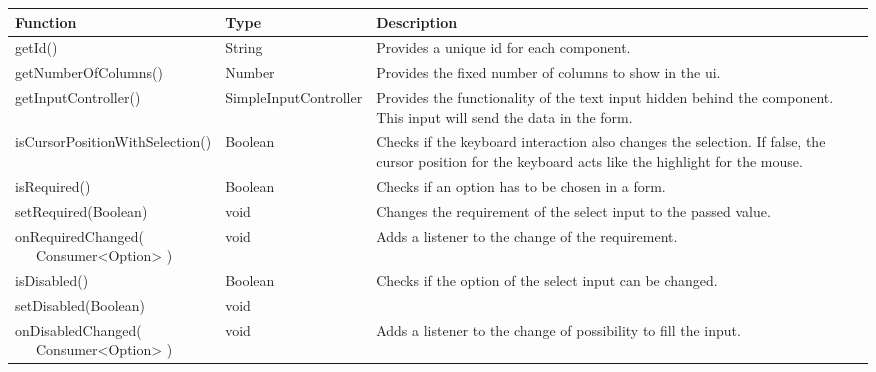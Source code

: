 \begin{table}[!htb] 
    \label{api:selectControllerReturn}
    \footnotesize
    \setlength\extrarowheight{4pt}
    \begin{tabular}{ p{5cm} p{3cm} p{4.5cm} }
        \toprule[1.2pt]
        \textbf{Function}                    & \textbf{Type}          & \textbf{Description} \\
        \midrule
        getId()                              & String                 & Provides a unique id for each component. \\
        getNumberOfColumns()                 & Number                 & Provides the fixed number of columns to show in the ui. \\
        getInputController()                 & SimpleInputController  & Provides the functionality of the text input hidden behind the component. 
                                                                        This input will send the data in the form. \\
        isCursorPositionWithSelection()      & Boolean                & Checks if the keyboard interaction also changes the selection. 
                                                                        If false, the cursor position for the keyboard acts like the highlight for the mouse. \\
        isRequired()                         & Boolean                & Checks if an option has to be chosen in a form. \\
        setRequired(Boolean)                 & void                   & Changes the requirement of the select input to the passed value. \\
        \tbbr{
            onRequiredChanged( \\
                \ \ \ Consumer<Option>
            )}                               & void                   & Adds a listener to the change of the requirement. \\
        isDisabled()                         & Boolean                & Checks if the option of the select input can be changed.  \\
        setDisabled(Boolean)                 & void                   &  \\
        \tbbr{
            onDisabledChanged( \\
                \ \ \ Consumer<Option>
            )}                               & void                   & Adds a listener to the change of possibility to fill the input. \\

\end{tabular}
\end{table}
